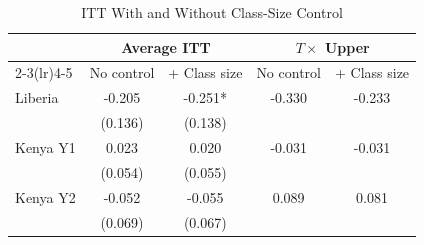 \begin{table}[htbp]
\centering\small
\caption{ITT With and Without Class-Size Control}
\label{tab:itt_classsize}
\begin{tabular}{lcccc}
\toprule
 & \multicolumn{2}{c}{Average ITT} & \multicolumn{2}{c}{$T \times$ Upper} \\
\cmidrule(lr){2-3}\cmidrule(lr){4-5}
 & No control & + Class size & No control & + Class size \\
\midrule
Liberia & -0.205 & -0.251* & -0.330 & -0.233 \\
 & (0.136) & (0.138) & & \\
Kenya Y1 & 0.023 & 0.020 & -0.031 & -0.031 \\
 & (0.054) & (0.055) & & \\
Kenya Y2 & -0.052 & -0.055 & 0.089 & 0.081 \\
 & (0.069) & (0.067) & & \\
\bottomrule
\end{tabular}
\par\smallskip{}
\end{table}